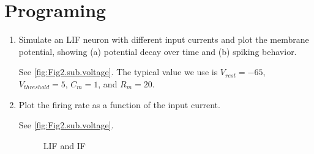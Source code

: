 \documentclass[11pt]{article}
\begin{document}
	\section*{Programing}
	\begin{enumerate}
		\item Simulate an LIF neuron with different input currents and plot the membrane potential, showing (a) potential decay over time and (b) spiking behavior.

		See \ref{fig:Fig2.sub.voltage}. The typical value we use is $V_{rest} = -65$, $V_{threshold} = 5$, $C_m = 1$, and $R_m = 20$.
		
		\item Plot the firing rate as a function of the input current.
		
		See \ref{fig:Fig2.sub.voltage}.
		
		\begin{figure}[htb]
			\centering
			\caption{LIF and IF}
		\end{figure}
		

\end{enumerate}
\end{document}

